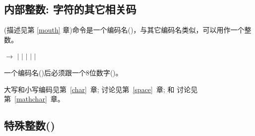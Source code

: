 \documentclass{book}
\begin{document}
\subsection{内部整数: 字符的其它相关码}

 (描述见第 \ref{mouth} 章)命令是一个编码名()，与其它编码名类似，可以用作一个整数。

\begin{disp} $\longrightarrow$  $|$ 
$|$  $|$ \nl \indent $|$  $|$ 
\end{disp}

一个编码名()后必须跟一个8位数字()。



大写和小写编码见第~\ref{char}~章; 讨论见第~\ref{space}~章; 
 和  讨论见第~\ref{mathchar}~章。


\subsection{特殊整数()}
\label{special:int:list}

\end{document}
